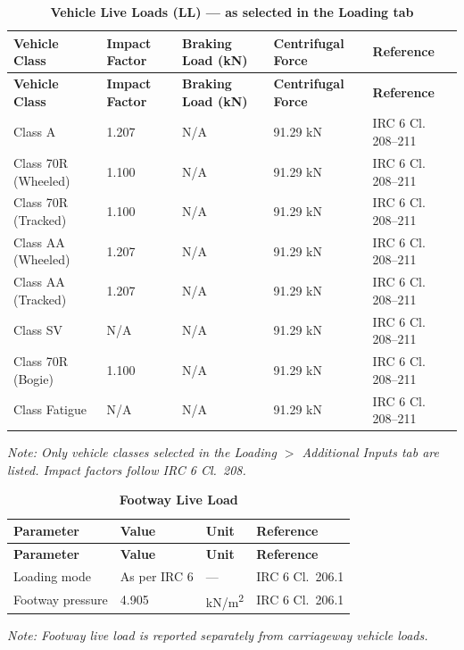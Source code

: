 \documentclass[12pt,a4paper]{report}
\numberwithin{table}{chapter}
\numberwithin{figure}{chapter}
\begin{document}
\vspace{1em}
\begin{longtable}{|L{4.3cm}|C{2.2cm}|C{2.8cm}|C{3.0cm}|L{2.5cm}|}
\caption{\textbf{Vehicle Live Loads (LL) --- as selected in the Loading tab}}
\hline
{} \textbf{Vehicle Class} & \textbf{Impact Factor} & \textbf{Braking Load (kN)} & \textbf{Centrifugal Force} & \textbf{Reference} \\[6pt]
\hline
\endfirsthead
\hline
{} \textbf{Vehicle Class} & \textbf{Impact Factor} & \textbf{Braking Load (kN)} & \textbf{Centrifugal Force} & \textbf{Reference} \\[6pt]
\hline
\endhead

Class A & 1.207 & N/A & 91.29 kN & IRC 6 Cl. 208--211 \\[4pt]
\hline
Class 70R (Wheeled) & 1.100 & N/A & 91.29 kN & IRC 6 Cl. 208--211 \\[4pt]
\hline
Class 70R (Tracked) & 1.100 & N/A & 91.29 kN & IRC 6 Cl. 208--211 \\[4pt]
\hline
Class AA (Wheeled) & 1.207 & N/A & 91.29 kN & IRC 6 Cl. 208--211 \\[4pt]
\hline
Class AA (Tracked) & 1.207 & N/A & 91.29 kN & IRC 6 Cl. 208--211 \\[4pt]
\hline
Class SV & N/A & N/A & 91.29 kN & IRC 6 Cl. 208--211 \\[4pt]
\hline
Class 70R (Bogie) & 1.100 & N/A & 91.29 kN & IRC 6 Cl. 208--211 \\[4pt]
\hline
Class Fatigue & N/A & N/A & 91.29 kN & IRC 6 Cl. 208--211 \\[4pt]
\hline
\end{longtable}
\noindent\textit{Note: Only vehicle classes selected in the Loading $>$
Additional Inputs tab are listed. Impact factors follow IRC 6 Cl.\ 208.}

\vspace{1em}
\begin{longtable}{|L{5.5cm}|C{3.0cm}|C{2.5cm}|L{4.0cm}|}
\caption{\textbf{Footway Live Load}}
\hline
{} \textbf{Parameter} & \textbf{Value} & \textbf{Unit} & \textbf{Reference} \\[6pt]
\hline
\endfirsthead
\hline
{} \textbf{Parameter} & \textbf{Value} & \textbf{Unit} & \textbf{Reference} \\[6pt]
\hline
\endhead

\textnormal{Loading mode} & As per IRC 6 & --- & IRC 6 Cl.\ 206.1 \\[6pt]
\hline
\textnormal{Footway pressure} & 4.905 & kN/m\textsuperscript{2} & IRC 6 Cl.\ 206.1 \\[6pt]
\hline
\end{longtable}
\noindent\textit{Note: Footway live load is reported separately from carriageway vehicle loads.}
\end{document}
